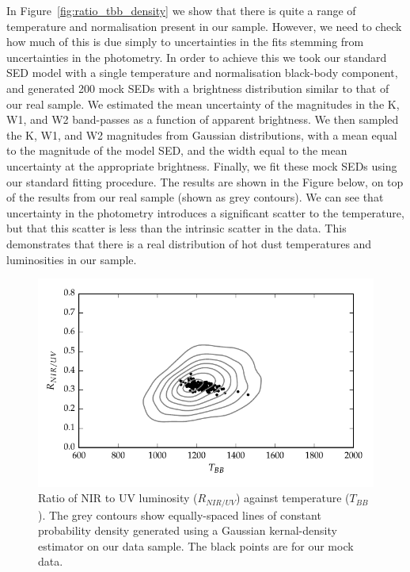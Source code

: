 In Figure~\ref{fig:ratio_tbb_density} we show that there is quite a range of temperature and normalisation present in our sample. 
However, we need to check how much of this is due simply to uncertainties in the fits stemming from uncertainties in the photometry. 
In order to achieve this we took our standard SED model with a single temperature and normalisation black-body component, and generated 200 mock SEDs with a brightness distribution similar to that of our real sample. 
We estimated the mean uncertainty of the magnitudes in the K, W1, and W2 band-passes as a function of apparent brightness. 
We then sampled the K, W1, and W2 magnitudes from Gaussian distributions, with a mean equal to the magnitude of the model SED, and the width equal to the mean uncertainty at the appropriate brightness. 
Finally, we fit these mock SEDs using our standard fitting procedure. 
The results are shown in the Figure below, on top of the results from our real sample (shown as grey contours). 
We can see that uncertainty in the photometry introduces a significant scatter to the temperature, but that this scatter is less than the intrinsic scatter in the data. 
This demonstrates that there is a real distribution of hot dust temperatures and luminosities in our sample. 

\begin{figure}
  \centering
  \includegraphics[width=\textwidth]{figures/chapter06/ratio_tbb_contours.pdf}
  \caption{Ratio of NIR to UV luminosity ($R_{NIR/UV}$) against temperature ($T_{BB}$). The grey contours show equally-spaced lines of constant probability density generated using a Gaussian kernal-density estimator on our data sample. The black points are for our mock data.}
  \label{fig:}
\end{figure}

